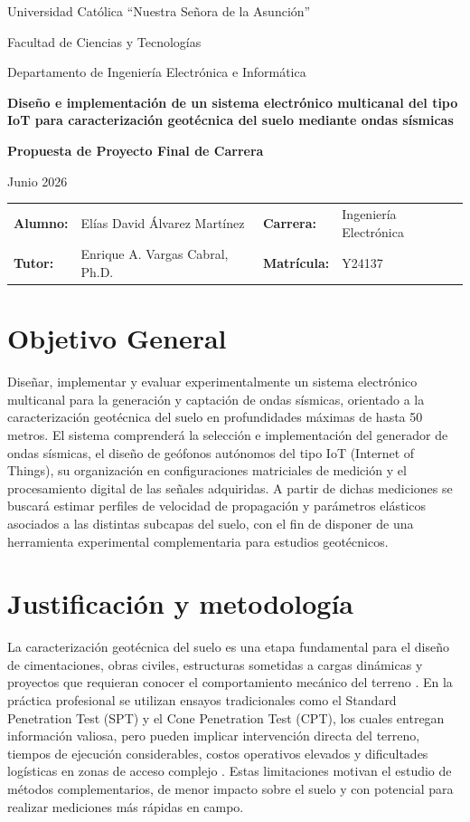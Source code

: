 \documentclass[11pt,a4paper]{article}
\newcommand{\universidad}{Universidad Cat\'olica ``Nuestra Se\~nora de la Asunci\'on''}
\newcommand{\facultad}{Facultad de Ciencias y Tecnolog\'ias}
\newcommand{\departamento}{Departamento de Ingenier\'ia Electr\'onica e Inform\'atica}
\newcommand{\titulo}{Dise\~no e implementaci\'on de un sistema electr\'onico multicanal del tipo IoT para caracterizaci\'on geot\'ecnica del suelo mediante ondas s\'ismicas}
\newcommand{\alumno}{El\'ias David \'Alvarez Mart\'inez}
\newcommand{\carrera}{Ingenier\'ia Electr\'onica}
\newcommand{\tutor}{Enrique A. Vargas Cabral, Ph.D.}
\newcommand{\matricula}{Y24137}
\begin{document}
	
	\begin{center}
		{\large \universidad}\par
		{\facultad}\par
		{\departamento}\par
		\vspace{0.28cm}
		{\Large\bfseries \titulo}\par
		\vspace{0.14cm}
		{\bfseries Propuesta de Proyecto Final de Carrera}\par
		Junio 2026
	\end{center}
	\vspace{0.07cm}
	\begin{tabularx}{\textwidth}{@{}lX lX@{}}
		\textbf{Alumno:} & \alumno & \textbf{Carrera:} & \carrera \\
		\textbf{Tutor:} & \tutor & \textbf{Matr\'icula:} & \matricula \\
	\end{tabularx}
	
	\section{Objetivo General}
	Dise\~nar, implementar y evaluar experimentalmente un sistema electr\'onico multicanal para la generaci\'on y captaci\'on de ondas s\'ismicas, orientado a la caracterizaci\'on geot\'ecnica del suelo en profundidades m\'aximas de hasta 50 metros. El sistema comprender\'a la selecci\'on e implementaci\'on del generador de ondas s\'ismicas, el dise\~no de ge\'ofonos aut\'onomos del tipo IoT (Internet of Things), su organizaci\'on en configuraciones matriciales de medici\'on y el procesamiento digital de las se\~nales adquiridas. A partir de dichas mediciones se buscar\'a estimar perfiles de velocidad de propagaci\'on y par\'ametros el\'asticos asociados a las distintas subcapas del suelo, con el fin de disponer de una herramienta experimental complementaria para estudios geot\'ecnicos.
	
	\section{Justificaci\'on y metodolog\'ia}
	La caracterizaci\'on geot\'ecnica del suelo es una etapa fundamental para el dise\~no de cimentaciones, obras civiles, estructuras sometidas a cargas din\'amicas y proyectos que requieran conocer el comportamiento mec\'anico del terreno \cite{Kramer1996,Mitchell2005}. En la pr\'actica profesional se utilizan ensayos tradicionales como el Standard Penetration Test (SPT) y el Cone Penetration Test (CPT), los cuales entregan informaci\'on valiosa, pero pueden implicar intervenci\'on directa del terreno, tiempos de ejecuci\'on considerables, costos operativos elevados y dificultades log\'isticas en zonas de acceso complejo \cite{ASTM}. Estas limitaciones motivan el estudio de m\'etodos complementarios, de menor impacto sobre el suelo y con potencial para realizar mediciones m\'as r\'apidas en campo.
	
\end{document}
